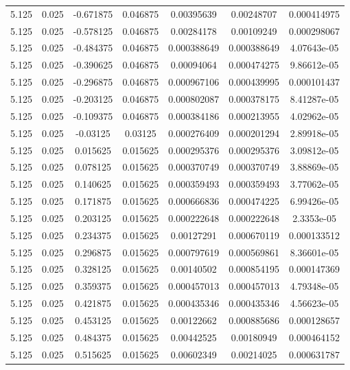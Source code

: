 \begin{table}[bh]
\begin{center}
{\begin{tabular}{ccccccc}
5.125	 & 0.025 & 	-0.671875	 & 0.046875	 & 0.00395639	 & 0.00248707	 & 0.000414975 \\ 
5.125	 & 0.025 & 	-0.578125	 & 0.046875	 & 0.00284178	 & 0.00109249	 & 0.000298067 \\ 
5.125	 & 0.025 & 	-0.484375	 & 0.046875	 & 0.000388649	 & 0.000388649	 & 4.07643e-05 \\ 
5.125	 & 0.025 & 	-0.390625	 & 0.046875	 & 0.00094064	 & 0.000474275	 & 9.86612e-05 \\ 
5.125	 & 0.025 & 	-0.296875	 & 0.046875	 & 0.000967106	 & 0.000439995	 & 0.000101437 \\ 
5.125	 & 0.025 & 	-0.203125	 & 0.046875	 & 0.000802087	 & 0.000378175	 & 8.41287e-05 \\ 
5.125	 & 0.025 & 	-0.109375	 & 0.046875	 & 0.000384186	 & 0.000213955	 & 4.02962e-05 \\ 
5.125	 & 0.025 & 	-0.03125	 & 0.03125	 & 0.000276409	 & 0.000201294	 & 2.89918e-05 \\ 
5.125	 & 0.025 & 	0.015625	 & 0.015625	 & 0.000295376	 & 0.000295376	 & 3.09812e-05 \\ 
5.125	 & 0.025 & 	0.078125	 & 0.015625	 & 0.000370749	 & 0.000370749	 & 3.88869e-05 \\ 
5.125	 & 0.025 & 	0.140625	 & 0.015625	 & 0.000359493	 & 0.000359493	 & 3.77062e-05 \\ 
5.125	 & 0.025 & 	0.171875	 & 0.015625	 & 0.000666836	 & 0.000474225	 & 6.99426e-05 \\ 
5.125	 & 0.025 & 	0.203125	 & 0.015625	 & 0.000222648	 & 0.000222648	 & 2.3353e-05 \\ 
5.125	 & 0.025 & 	0.234375	 & 0.015625	 & 0.00127291	 & 0.000670119	 & 0.000133512 \\ 
5.125	 & 0.025 & 	0.296875	 & 0.015625	 & 0.000797619	 & 0.000569861	 & 8.36601e-05 \\ 
5.125	 & 0.025 & 	0.328125	 & 0.015625	 & 0.00140502	 & 0.000854195	 & 0.000147369 \\ 
5.125	 & 0.025 & 	0.359375	 & 0.015625	 & 0.000457013	 & 0.000457013	 & 4.79348e-05 \\ 
5.125	 & 0.025 & 	0.421875	 & 0.015625	 & 0.000435346	 & 0.000435346	 & 4.56623e-05 \\ 
5.125	 & 0.025 & 	0.453125	 & 0.015625	 & 0.00122662	 & 0.000885686	 & 0.000128657 \\ 
5.125	 & 0.025 & 	0.484375	 & 0.015625	 & 0.00442525	 & 0.00180949	 & 0.000464152 \\ 
5.125	 & 0.025 & 	0.515625	 & 0.015625	 & 0.00602349	 & 0.00214025	 & 0.000631787 \\ 

\end{tabular}}
\end{center}
\end{table}
